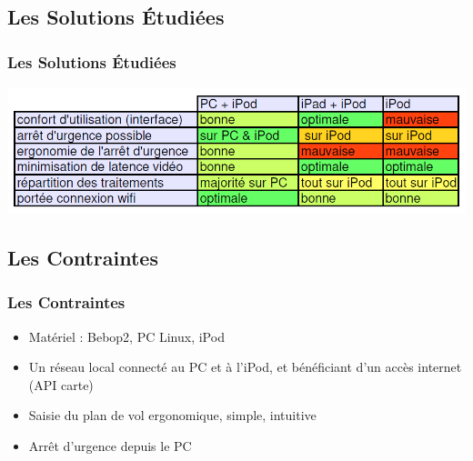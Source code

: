 \documentclass{beamer}
\begin{document}
	\begin{frame}
	\section{Les Solutions Étudiées}
		\begin{center}
		\frametitle{Les Solutions Étudiées}
            \includegraphics[scale=0.45]{comparatif_v2.PNG}
		\end{center}
	\end{frame}
	\begin{frame}
	\section{Les Contraintes}
		\begin{center}
		\frametitle{Les Contraintes}
           	\begin{itemize}
                \item Matériel : Bebop2, PC Linux, iPod
                \item Un réseau local connecté au PC et à l'iPod, et bénéficiant d'un accès internet (API carte)
                \item Saisie du plan de vol ergonomique, simple, intuitive
                \item Arrêt d'urgence depuis le PC
            \end{itemize}
		\end{center}
	\end{frame}
\end{document}

